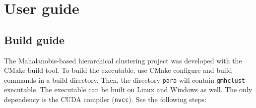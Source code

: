 \documentclass[12pt,a4paper,twoside,openright]{report}
\begin{document}



\tableofcontents















\appendix
\chapter{User guide}

\section{Build guide}

The Mahalanobis-based hierarchical clustering project was developed with the CMake build tool. To build the executable, use CMake configure and build commands in a build directory. Then, the directory \texttt{para} will contain \texttt{gmhclust} executable. The executable can be built on Linux and Windows as well. The only dependency is the CUDA compiler (\texttt{nvcc}). See the following steps:
\end{document}
